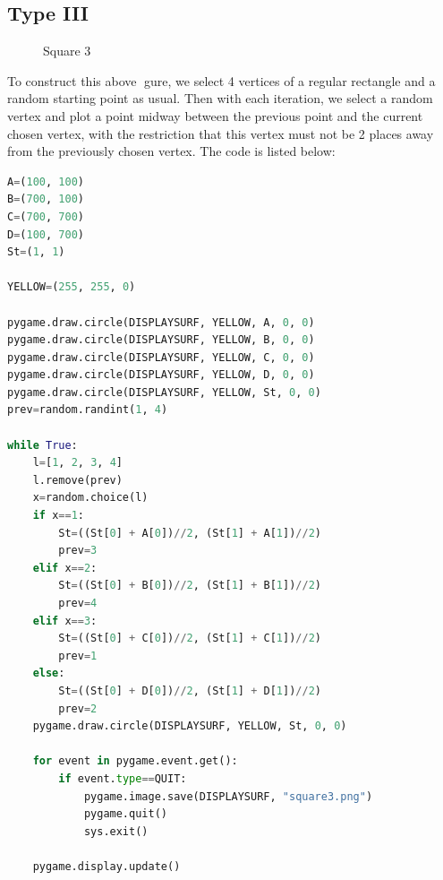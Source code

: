 \documentclass{article}
\begin{document}
\subsection{Type III}
\begin{figure}[H]
\centering 
\noindent{}%
\caption{Square 3}
\end{figure}
To construct this above gure, we select 4 vertices of a regular rectangle and a random starting point as usual. Then with each iteration, we select a random vertex and plot a point midway between the previous point and the current chosen vertex, with the restriction that this vertex must not be 2 places away from the previously chosen vertex. The code is listed below:
\begin{lstlisting}[language=Python, frame=single]
A=(100, 100)
B=(700, 100)
C=(700, 700)
D=(100, 700)
St=(1, 1)

YELLOW=(255, 255, 0)

pygame.draw.circle(DISPLAYSURF, YELLOW, A, 0, 0)
pygame.draw.circle(DISPLAYSURF, YELLOW, B, 0, 0)
pygame.draw.circle(DISPLAYSURF, YELLOW, C, 0, 0)
pygame.draw.circle(DISPLAYSURF, YELLOW, D, 0, 0)
pygame.draw.circle(DISPLAYSURF, YELLOW, St, 0, 0)
prev=random.randint(1, 4)

while True:
    l=[1, 2, 3, 4]
    l.remove(prev)
    x=random.choice(l)
    if x==1:
        St=((St[0] + A[0])//2, (St[1] + A[1])//2)
        prev=3
    elif x==2:
        St=((St[0] + B[0])//2, (St[1] + B[1])//2)
        prev=4
    elif x==3:
        St=((St[0] + C[0])//2, (St[1] + C[1])//2)
        prev=1
    else:
        St=((St[0] + D[0])//2, (St[1] + D[1])//2)
        prev=2
    pygame.draw.circle(DISPLAYSURF, YELLOW, St, 0, 0)

    for event in pygame.event.get():
        if event.type==QUIT:
            pygame.image.save(DISPLAYSURF, "square3.png")
            pygame.quit()
            sys.exit()
    
    pygame.display.update()
\end{lstlisting}
\end{document}
